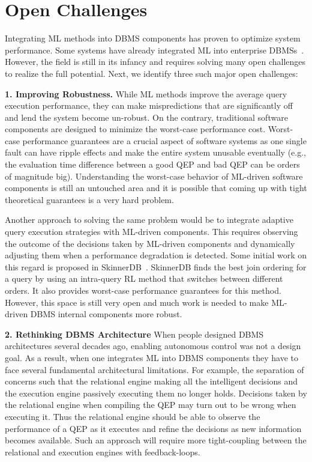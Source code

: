 \section{Open Challenges}
Integrating ML methods into DBMS components has proven to optimize system performance.
Some systems have already integrated ML into enterprise DBMSs~\cite{leo, cardlearner, verdict}.
However, the field is still in its infancy and requires solving many open challenges to realize the full potential.
Next, we identify three such major open challenges:


\vspace{2mm}
\noindent \textbf{1. Improving Robustness.} While ML methods improve the average query execution performance, they can make mispredictions that are significantly off and lend the system become un-robust.
On the contrary, traditional software components are designed to minimize the worst-case performance cost.
Worst-case performance guarantees are a crucial aspect of software systems as one single fault can have ripple effects and make the entire system unusable eventually (e.g., the evaluation time difference between a good QEP and bad QEP can be orders of magnitude big).
Understanding the worst-case behavior of ML-driven software components is still an untouched area and it is possible that coming up with tight theoretical guarantees is a very hard problem.
 
Another approach to solving the same problem would be to integrate adaptive query execution strategies with ML-driven components.
This requires observing the outcome of the decisions taken by ML-driven components and dynamically adjusting them when a performance degradation is detected.
Some initial work on this regard is proposed in SkinnerDB~\cite{skinnerdb}.
SkinnerDB finds the best join ordering for a query by using an intra-query RL method that switches between different orders.
It also provides worst-case performance guarantees for this method.
However, this space is still very open and much work is needed to make ML-driven DBMS internal components more robust.


\vspace{2mm}
\noindent \textbf{2. Rethinking DBMS Architecture} When people designed DBMS architectures several decades ago, enabling autonomous control was not a design goal.
As a result, when one integrates ML into DBMS components they have to face several fundamental architectural limitations.
For example, the separation of concerns such that the relational engine making all the intelligent decisions and the execution engine passively executing them no longer holds.
Decisions taken by the relational engine when compiling the QEP may turn out to be wrong when executing it.
Thus the relational engine should be able to observe the performance of a QEP as it executes and refine the decisions as new information becomes available.
Such an approach will require more tight-coupling between the relational and execution engines with feedback-loops.

